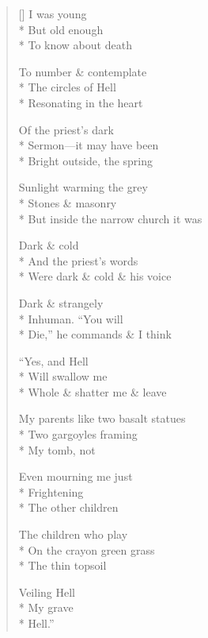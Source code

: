 \label{ch:age_of_reason}
\settowidth{\versewidth}{But inside the narrow church it was}
\begin{verse}[\versewidth]
I was young\\*
But old enough\\*
To know about death

To number \& contemplate\\*
The circles of Hell\\*
Resonating in the heart

Of the priest's dark\\*
Sermon---it may have been\\*
Bright outside, the spring

Sunlight warming the grey\\*
Stones \& masonry\\*
But inside the narrow church it was

Dark \& cold\\*
And the priest's words\\*
Were dark \& cold \& his voice

Dark \& strangely\\*
Inhuman. ``You will\\*
Die,'' he commands \& I think

``Yes, and Hell\\*
Will swallow me\\*
Whole \& shatter me \& leave

My parents like two basalt statues\\*
Two gargoyles framing\\*
My tomb, not

Even mourning me just\\*
Frightening \\*
The other children

The children who play\\*
On the crayon green grass\\*
The thin topsoil

Veiling Hell\\*
My grave\\*
Hell.''
\end{verse}
